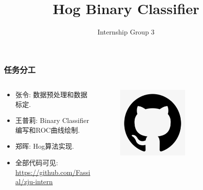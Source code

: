 \documentclass[notheorems, aspectratio=54]{beamer}
\title[Hog Binary Classifier]{Hog Binary Classifier}
\author{Internship Group 3}
\institute[]{Wang PuLi, Zhang Ling, Zheng Hui}
\begin{document}
\begin{frame}
    \titlepage
\end{frame}

\section{}
\subsection{}
\begin{frame}
\frametitle{任务分工}
\begin{columns}
\begin{column}{.8\linewidth}
\begin{itemize}
	\item 张令: 数据预处理和数据标定.
	\item 王普莉: Binary Classifier编写和ROC曲线绘制.
	\item 郑晖: Hog算法实现.
	\item 全部代码可见: {\href{https://github.com/Fassial/zju-intern}{https://github.com/Fassial/zju-intern}}
\end{itemize}
\end{column}
\begin{column}{.2\linewidth}
\begin{figure}[htbp]
	\centering
	\includegraphics[width=0.6\textwidth]{github.jpg}
\end{figure}
\end{column}
\end{columns}
\end{frame}
\end{document}
